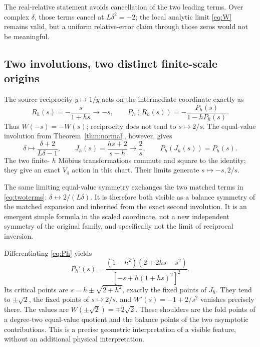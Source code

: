 The real-relative statement avoids cancellation of the two leading terms. Over complex \(\delta\), those terms cancel at \(L\delta^2=-2\); the local analytic limit \eqref{eq:W} remains valid, but a uniform relative-error claim through those zeros would not be meaningful.

\subsection{Two involutions, two distinct finite-scale origins}
The source reciprocity \(y\mapsto1/y\) acts on the intermediate coordinate exactly as
\begin{equation}\label{eq:Rh}
R_h(s)=-\frac{s}{1+hs}\longrightarrow-s,
\qquad P_h(R_h(s))=-\frac{P_h(s)}{1-hP_h(s)}.
\end{equation}
Thus \(W(-s)=-W(s)\); reciprocity does not tend to \(s\mapsto2/s\). The equal-value involution from Theorem~\ref{thm:normal}, however, gives
\begin{equation}\label{eq:Jh}
\delta\mapsto\frac{\delta+2}{L\delta-1},\qquad
J_h(s)=\frac{hs+2}{s-h}\longrightarrow\frac2s,
\qquad P_h(J_h(s))=P_h(s).
\end{equation}
The two finite-
\(h\) Möbius transformations commute and square to the identity; they give an exact \(V_4\) action in this chart. Their limits generate \(s\mapsto-s,2/s\).

The same limiting equal-value symmetry exchanges the two matched terms in \eqref{eq:twoterms}: \(\delta\leftrightarrow2/(L\delta)\). It is therefore both visible as a balance symmetry of the matched expansion and inherited from the exact second involution. It is an emergent simple formula in the scaled coordinate, not a new independent symmetry of the original family, and specifically not the limit of reciprocal inversion.

Differentiating \eqref{eq:Ph} yields
\begin{equation}\label{eq:shoulders}
P_h'(s)=\frac{(1-h^2)(2+2hs-s^2)}{[-s+h(1+hs)^2]^2}.
\end{equation}
Its critical points are \(s=h\pm\sqrt{2+h^2}\), exactly the fixed points of \(J_h\). They tend to \(\pm\sqrt2\), the fixed points of \(s\mapsto2/s\), and
\(W'(s)=-1+2/s^2\) vanishes precisely there. The values are \(W(\pm\sqrt2)=\mp2\sqrt2\). These shoulders are the fold points of a degree-two equal-value quotient and the balance points of the two asymptotic contributions. This is a precise geometric interpretation of a visible feature, without an additional physical interpretation.

